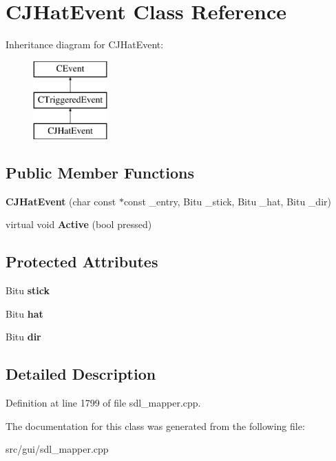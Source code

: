 \hypertarget{classCJHatEvent}{\section{C\-J\-Hat\-Event Class Reference}
\label{classCJHatEvent}
}
Inheritance diagram for C\-J\-Hat\-Event\-:\begin{figure}[H]
\begin{center}
\leavevmode
\includegraphics[height=3.000000cm]{classCJHatEvent}
\end{center}
\end{figure}
\subsection*{Public Member Functions}
\begin{DoxyCompactItemize}
\item 
\hypertarget{classCJHatEvent_a75c1276a13b233799993bb69bfbffedf}{{\bfseries C\-J\-Hat\-Event} (char const $\ast$const \-\_\-entry, Bitu \-\_\-stick, Bitu \-\_\-hat, Bitu \-\_\-dir)}\label{classCJHatEvent_a75c1276a13b233799993bb69bfbffedf}

\item 
\hypertarget{classCJHatEvent_ad4b66a30f706388e5568090963a22dee}{virtual void {\bfseries Active} (bool pressed)}\label{classCJHatEvent_ad4b66a30f706388e5568090963a22dee}

\end{DoxyCompactItemize}
\subsection*{Protected Attributes}
\begin{DoxyCompactItemize}
\item 
\hypertarget{classCJHatEvent_a53d2e407f823a8bd30a2c0d5613cb29b}{Bitu {\bfseries stick}}\label{classCJHatEvent_a53d2e407f823a8bd30a2c0d5613cb29b}

\item 
\hypertarget{classCJHatEvent_a33cb6a20470c519958c6fd0929bcc7cd}{Bitu {\bfseries hat}}\label{classCJHatEvent_a33cb6a20470c519958c6fd0929bcc7cd}

\item 
\hypertarget{classCJHatEvent_a8f7cc4b080b4f6054d6da118209683b7}{Bitu {\bfseries dir}}\label{classCJHatEvent_a8f7cc4b080b4f6054d6da118209683b7}

\end{DoxyCompactItemize}


\subsection{Detailed Description}


Definition at line 1799 of file sdl\-\_\-mapper.\-cpp.



The documentation for this class was generated from the following file\-:\begin{DoxyCompactItemize}
\item 
src/gui/sdl\-\_\-mapper.\-cpp\end{DoxyCompactItemize}
